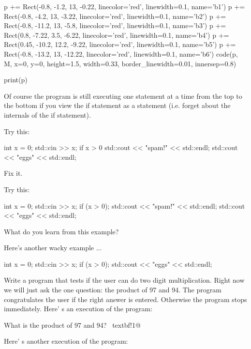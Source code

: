 \begin{python}
p += Rect(-0.8, -1.2, 13, -0.22, linecolor='red', linewidth=0.1, name='b1')
p += Rect(-0.8, -4.2, 13, -3.22, linecolor='red', linewidth=0.1, name='b2')
p += Rect(-0.8, -11.2, 13, -5.8, linecolor='red', linewidth=0.1, name='b3')
p += Rect(0.8, -7.22, 3.5, -6.22, linecolor='red', linewidth=0.1, name='b4')
p += Rect(0.45, -10.2, 12.2, -9.22, linecolor='red', linewidth=0.1, name='b5')
p += Rect(-0.8, -13.2, 13, -12.22, linecolor='red', linewidth=0.1, name='b6')
code(p, M, x=0, y=0, height=1.5, width=0.33, border_linewidth=0.01, innersep=0.8)

print(p)
\end{python}

Of course the program is still executing one statement at a time from
the top to the bottom if you view the if statement as a statement (i.e.
forget about the internals of the if statement).

\newpage{}

\begin{ex}
Try this:\\
\begin{console}
int x = 0;
std::cin >> x;
if x > 0
   std::cout << "spam!" << std::endl;
std::cout << "eggs" << std::endl;
\end{console}
Fix it.
\end{ex}

\begin{ex}
Try this:\\
\begin{console}
int x = 0;
std::cin >> x;
if (x > 0);
   std::cout << "spam!" << std::endl;
std::cout << "eggs" << std::endl;
\end{console}
What do you learn from this example?
\end{ex}

\begin{ex}
Here's another wacky example ...
\begin{console}
int x = 0;
std::cin >> x;
if (x > 0);
std::cout << "eggs" << std::endl;
\end{console}
\end{ex}

\newpage{}

\begin{ex}
Write a program that tests if the user can do two digit
multiplication. Right now we will just ask the one question: the product
of 97 and 94. The program congratulates the user if the right answer is
entered. Otherwise the program stops immediately. Here' s
an execution of the program:\\
\begin{console}[commandchars=\~\!\@]
What is the product of 97 and 94? ~textbf!1@
\end{console}
Here' s another execution of the program:\\
\end{ex}

